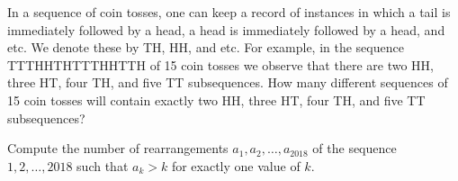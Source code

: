 \documentclass[mast]{lucky}
\begin{document}
     \begin{prob}[AIME 1986/13]{9}
In a sequence of coin tosses, one can keep a record of instances in which a tail is immediately followed by a head, a head is immediately followed by a head, and etc. We denote these by TH, HH, and etc. For example, in the sequence TTTHHTHTTTHHTTH of 15 coin tosses we observe that there are two HH, three HT, four TH, and five TT subsequences. How many different sequences of 15 coin tosses will contain exactly two HH, three HT, four TH, and five TT subsequences?
\end{prob}
    
     \begin{prob}[CMIMC 2018]{13}
Compute the number of rearrangements $a_1,a_2,\ldots,a_{2018}$ of the sequence $1,2,\ldots,2018$ such that $a_k>k$ for exactly one value of $k.$
\end{prob}
\end{document}
